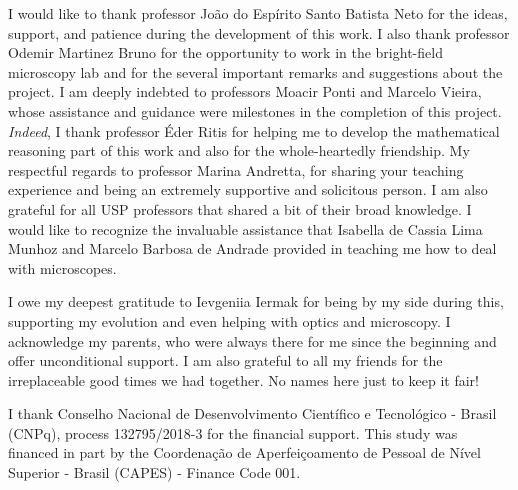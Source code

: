 I would like to thank professor João do Espírito Santo Batista Neto for the ideas, support, and patience during the development of this work. I also thank professor Odemir Martinez Bruno for the opportunity to work in the bright-field microscopy lab and for the several important remarks and suggestions about the project. I am deeply indebted to professors Moacir Ponti and Marcelo Vieira, whose assistance and guidance were milestones in the completion of this project. \textit{Indeed}, I thank professor Éder Ritis for helping me to develop the mathematical reasoning part of this work and also for the whole-heartedly friendship. My respectful regards to professor Marina Andretta, for sharing your teaching experience and being an extremely supportive and solicitous person. I am also grateful for all USP professors that shared a bit of their broad knowledge. I would like to recognize the invaluable assistance that Isabella de Cassia Lima Munhoz and Marcelo Barbosa de Andrade provided in teaching me how to deal with microscopes.

I owe my deepest gratitude to Ievgeniia Iermak for being by my side during this, supporting my evolution and even helping with optics and microscopy. I acknowledge my parents, who were always there for me since the beginning and offer unconditional support. I am also grateful to all my friends for the irreplaceable good times we had together. No names here just to keep it fair!

I thank Conselho Nacional de Desenvolvimento Científico e Tecnológico - Brasil (CNPq), process 132795/2018-3 for the financial support. This study was financed in part by the Coordenação de Aperfeiçoamento de Pessoal de Nível Superior - Brasil (CAPES) - Finance Code 001.